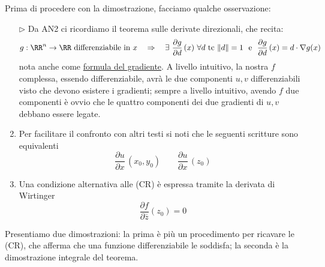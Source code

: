 Prima di procedere con la dimostrazione, facciamo qualche osservazione:
\begin{enumerate}
    \item [$\triangleright$] Da AN2 ci ricordiamo il teorema sulle derivate direzionali, che recita:
    \begin{equation*}
    g:\RR^n\to\RR\text{ differenziabile in }x\quad\Rightarrow\quad \exists\ \frac{\partial g}{\partial d}\,(x)\ \forall d\text{ tc }\Vert d\Vert=1\ \text{ e }\ \frac{\partial g}{\partial d}\,(x)=d\cdot \nabla g(x)
    \end{equation*}
    nota anche come \underline{formula del gradiente}. A livello intuitivo, la nostra $f$ complessa, essendo differenziabile, avrà le due componenti $u,v$ differenziabili visto che devono esistere i gradienti; sempre a livello intuitivo, avendo $f$ due componenti è ovvio che le quattro componenti dei due gradienti di $u,v$ debbano essere legate. 

    \item Per facilitare il confronto con altri testi si noti che le seguenti scritture sono equivalenti
    \begin{equation*}
    \frac{\partial u}{\partial x}\,(x_0,y_0)\qquad\frac{\partial u}{\partial x}\,(z_0)
    \end{equation*}

    \item Una condizione alternativa alle (CR) è espressa tramite la derivata di Wirtinger
    \begin{equation*}
    \frac{\partial f}{\partial\overline{z}}(z_0)=0
    \end{equation*}

\end{enumerate}

Presentiamo due dimostrazioni: la prima è più un procedimento per ricavare le (CR), che afferma che una funzione differenziabile le soddisfa; la seconda è la dimostrazione integrale del teorema.

